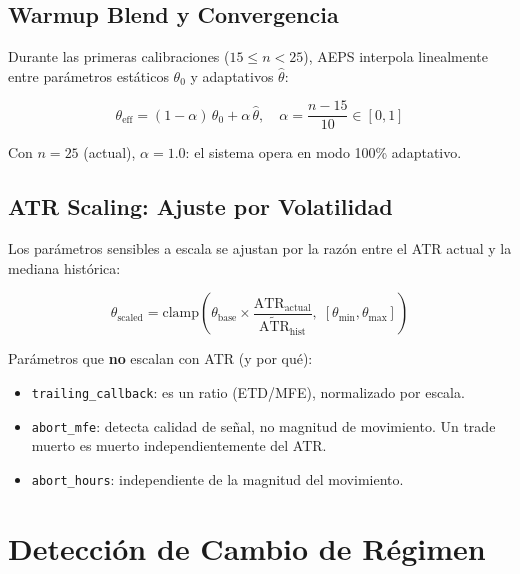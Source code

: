 \documentclass[11pt,a4paper]{article}
\newcommand{\param}[1]{\texttt{\small\color{cpurple}#1}}
\begin{document}
\subsection{Warmup Blend y Convergencia}

Durante las primeras calibraciones ($15 \leq n < 25$), AEPS
interpola linealmente entre par\'ametros est\'aticos $\theta_0$
y adaptativos $\hat\theta$:

\begin{equation}
\theta_{\text{eff}} = (1-\alpha)\,\theta_0 + \alpha\,\hat\theta,
\quad \alpha = \frac{n - 15}{10} \in [0, 1]
\end{equation}

Con $n = 25$ (actual), $\alpha = 1.0$: el sistema opera en modo
100\% adaptativo.

\subsection{ATR Scaling: Ajuste por Volatilidad}

Los par\'ametros sensibles a escala se ajustan por la raz\'on
entre el ATR actual y la mediana hist\'orica:

\begin{equation}
\theta_{\text{scaled}} = \text{clamp}\!\left(
  \theta_{\text{base}} \times \frac{\text{ATR}_{\text{actual}}}
  {\widetilde{\text{ATR}}_{\text{hist}}},
  \; [\theta_{\min}, \theta_{\max}]
\right)
\end{equation}

Par\'ametros que \textbf{no} escalan con ATR (y por qu\'e):
\begin{itemize}[leftmargin=1.5em]
\item \param{trailing\_callback}: es un ratio (ETD/MFE),
  normalizado por escala.
\item \param{abort\_mfe}: detecta calidad de se\~nal, no magnitud
  de movimiento. Un trade muerto es muerto independientemente del ATR.
\item \param{abort\_hours}: independiente de la magnitud del movimiento.
\end{itemize}


\section{Detecci\'on de Cambio de R\'egimen}
\label{sec:regime}
\end{document}
